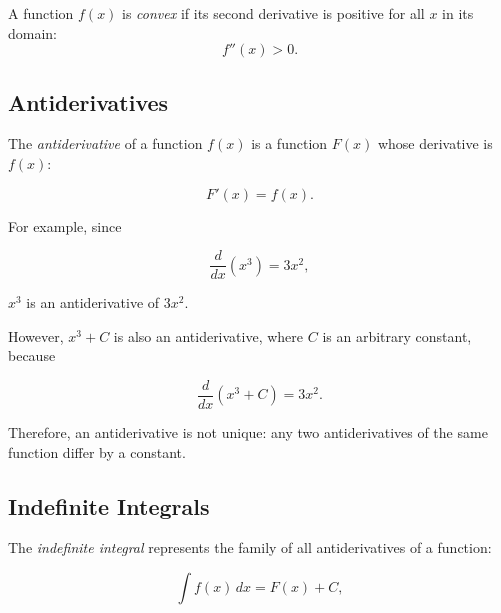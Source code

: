 \documentclass[../main.tex]{subfiles}
\begin{document}
A function \(f(x)\) is \emph{convex} if its second derivative is positive for all \(x\) in its domain:
\[
f''(x) > 0.
\]  

\begin{center}
\end{center}


\subsection{Antiderivatives}

The \emph{antiderivative} of a function \(f(x)\) is a function \(F(x)\) whose derivative is \(f(x)\):

\[
F'(x) = f(x).
\]

For example, since

\[
\frac{d}{dx}(x^3) = 3x^2,
\]

\(x^3\) is an antiderivative of \(3x^2\).

However, \(x^3+C\) is also an antiderivative, where \(C\) is an arbitrary constant, because

\[
\frac{d}{dx}(x^3+C) = 3x^2.
\]

Therefore, an antiderivative is not unique: any two antiderivatives of the same function differ by a constant.

\subsection{Indefinite Integrals}

The \emph{indefinite integral} represents the family of all antiderivatives of a function:

\[
\int f(x)\,dx = F(x)+C,
\]
\end{document}
